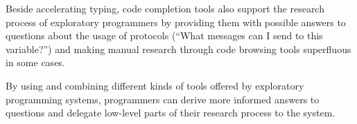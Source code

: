 	Beside accelerating typing, code completion tools also support the research process of exploratory programmers by providing them with possible answers to questions about the usage of protocols (``What messages can I send to this variable?'') and making manual research through code browsing tools superfluous in some cases.

\ParSep

By using and combining different kinds of tools offered by exploratory programming systems, programmers can derive more informed answers to questions and delegate low-level parts of their research process to the system.
